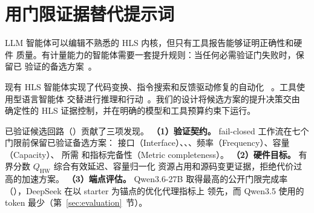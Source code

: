 \section{用门限证据替代提示词}

LLM 智能体可以编辑不熟悉的 HLS 内核，但只有工具报告能够证明正确性和硬件
质量。有计量能力的智能体需要一套提升规则：当任何必需验证门失败时，保留已
验证的备选方案~\cite{amd2025vitis}。

现有 HLS 智能体实现了代码变换、指令搜索和反馈驱动修复的自动化
~\cite{xiong2024hlspilot,xu2024ralad,li2026chathls}。工具使用型语言智能体
交替进行推理和行动~\cite{yao2023react}。我们的设计将候选方案的提升决策交由
确定性的 HLS 证据控制，并在明确的模型和工具预算约束下运行。

已验证候选回路（\VCL）贡献了三项发现。
\textbf{（1）验证契约。} fail-closed 工作流在七个门限前保留已验证备选方案：
接口（Interface）、\CSim、\Synth、频率（Frequency）、容量（Capacity）、
所需 \CoSim{} 和指标完备性（Metric completeness）。
\textbf{（2）硬件目标。} 有界分数 $Q_{\mathrm{HW}}$ 综合有效延迟、容量归一化
资源占用和源码变更证据，拒绝代价过高的加速方案。
\textbf{（3）端点评估。} Qwen3.6-27B 取得最高的公开门限完成率
（\QwenThreeSixSuccessRate），DeepSeek 在以 starter 为锚点的优化代理指标上
领先，而 Qwen3.5 使用的 token 最少（第~\ref{sec:evaluation}~节）。
